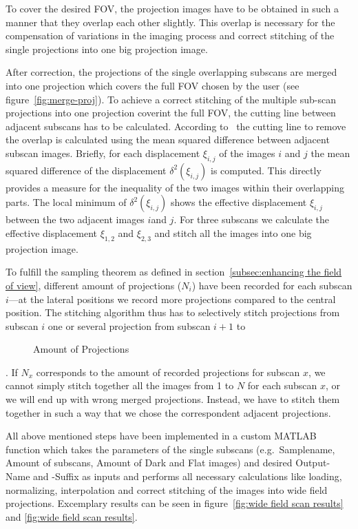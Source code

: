 To cover the desired FOV, the projection images have to be obtained in such a manner that they overlap each other slightly. This overlap is necessary for the compensation of variations in the imaging process and correct stitching of the single projections into one big projection image. 

After correction, the projections of the single overlapping subscans are merged into one projection which covers the full FOV chosen by the user (see figure~\ref{fig:merge-proj}). To achieve a correct stitching of the multiple sub-scan projections into one projection coverint the full FOV, the cutting line between adjacent subscans has to be calculated. According to~\citet{Hintermueller2009} the cutting line to remove the overlap is calculated using the mean squared difference between adjacent subscan images. Briefly, for each displacement $\xi_{i,j}$ of the images $i$ and $j$ the mean squared difference of the displacement $\delta^2(\xi_{i,j})$ is computed. This directly provides a measure for the inequality of the two images within their overlapping parts. The local minimum of $\delta^2(\xi_{i,j})$ shows the effective displacement $\xi_{i,j}$ between the two adjacent images $i$and $j$. For three subscans we calculate the effective displacement $\xi_{1,2}$ and $\xi_{2,3}$ and stitch all the images into one big projection image.

To fulfill the sampling theorem as defined in section~\ref{subsec:enhancing the field of view}, different amount of projections ($N_{i}$) have been recorded for each subscan $i$---at the lateral positions we record more projections compared to the central position. The stitching algorithm thus has to selectively stitch projections from subscan $i$ one or several projection from subscan $i+1$ to

\begin{figure}
	\centering
	\caption{Amount of Projections}%
	\label{fig:amount of projections}%
\end{figure}

. If $N_{x}$ corresponds to the amount of recorded projections for subscan $x$, we cannot simply stitch together all the images from 1 to $N$ for each subscan $x$, or we will end up with wrong merged projections. Instead, we have to stitch them together in such a way that we chose the correspondent adjacent projections.

All above mentioned steps have been implemented in a custom MATLAB\textsuperscript{\textregistered} function which takes the parameters of the single subscans (e.g.\ Samplename, Amount of subscans, Amount of Dark and Flat images) and desired Output-Name and -Suffix as inputs and performs all necessary calculations like loading, normalizing, interpolation and correct stitching of the images into wide field projections. Excemplary results can be seen in figure~\ref{fig:wide field scan results} and \ref{fig:wide field scan results}.

